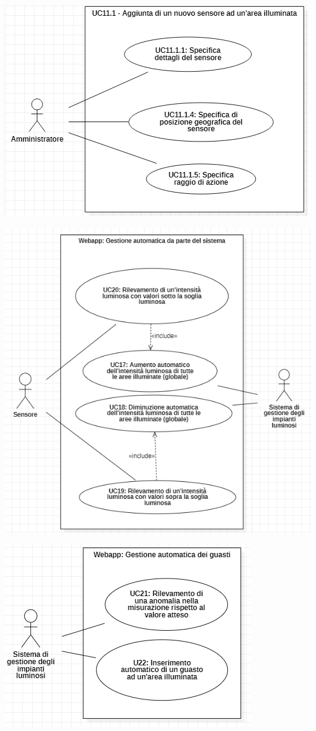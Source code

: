 \documentclass[a4paper, 12pt]{article}
\begin{document}
\includegraphics[scale=0.60]{diagramma_use_case_10.png}

\includegraphics[scale=0.63]{diagramma_use_case_11.png}

\includegraphics[scale=0.65]{diagramma_use_case_12.png}
\end{document}
